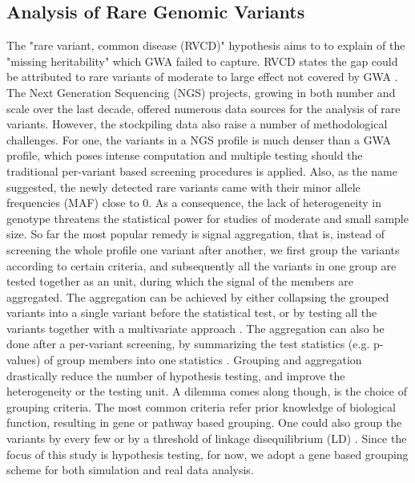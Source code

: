 \subsection{Analysis of Rare Genomic Variants}
The "rare variant, common disease (RVCD)" hypothesis aims to to explain of the "missing heritability" which GWA failed to capture. RVCD states the gap could be attributed to rare variants of moderate to large effect not covered by GWA \cite{RVCD1}. The Next Generation Sequencing (NGS) projects, growing in both number and scale over the last decade, offered numerous data sources for the analysis of rare variants. However, the stockpiling data also raise a number of methodological challenges. For one, the variants in a NGS profile is much denser than a GWA profile, which poses intense computation and multiple testing should the traditional per-variant based screening procedures is applied. Also, as the name suggested, the newly detected rare variants came with their minor allele frequencies (MAF) close to 0. As a consequence, the lack of heterogeneity in genotype threatens the statistical power for studies of moderate and small sample size. So far the most popular remedy is signal aggregation, that is, instead of screening the whole profile one variant after another, we first group the variants according to certain criteria, and subsequently all the variants in one group are tested together as an unit, during which the signal of the members are aggregated. The aggregation can be achieved by either collapsing the grouped variants into a single variant \cite{Burden1} before the statistical test, or by testing all the variants together with a multivariate approach \cite{UST1, UST2, SKT}. The aggregation can also be done after a per-variant screening, by summarizing the test statistics (e.g. p-values) of group members into one statistics \cite{Dai:2015, plink1}. Grouping and aggregation drastically reduce the number of hypothesis testing, and improve the heterogeneity or the testing unit. A dilemma comes along though, is the choice of grouping criteria. The most common criteria refer prior knowledge of biological function, resulting in gene or pathway based grouping. One could also group the variants by every few or by a threshold of linkage disequilibrium (LD) \cite{plink1}. Since the focus of this study is hypothesis testing, for now, we adopt a gene based grouping scheme for both simulation and real data analysis.

